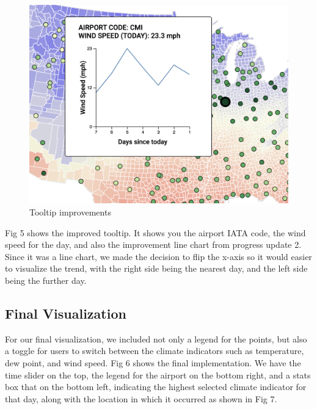 \documentclass[9pt,twocolumn,twoside]{opticajnl}
\begin{document}
\begin{figure}
    \centering
    \includegraphics[scale=0.4]{images/img6.png}
    \caption{Tooltip improvements}
\end{figure}

Fig 5 shows the improved tooltip. It shows you the airport IATA code, the wind speed for the day, and also the improvement line chart from progress update 2. Since it was a line chart, we made the decision to flip the x-axis so it would easier to visualize the trend, with the right side being the nearest day, and the left side being the further day.

\subsection {Final Visualization}

For our final visualization, we included not only a legend for the points, but also a toggle for users to switch between the climate indicators such as temperature, dew point, and wind speed. Fig 6 shows the final implementation. We have the time slider on the top, the legend for the airport on the bottom right, and a stats box that on the bottom left, indicating the highest selected climate indicator for that day, along with the location in which it occurred as shown in Fig 7.
\end{document}
